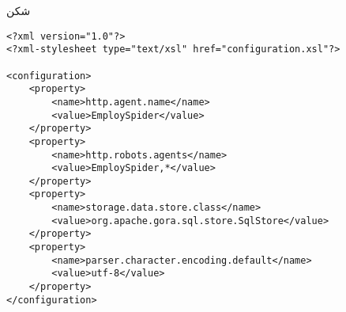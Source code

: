 ‌شکن

\begin{latin} 
\begin{lstlisting}[style=listXML]
<?xml version="1.0"?>
<?xml-stylesheet type="text/xsl" href="configuration.xsl"?>

<configuration>
	<property>
		<name>http.agent.name</name>
		<value>EmploySpider</value>
	</property>
	<property>
		<name>http.robots.agents</name>
		<value>EmploySpider,*</value>
	</property>
	<property>
		<name>storage.data.store.class</name>
		<value>org.apache.gora.sql.store.SqlStore</value>
	</property>
	<property>
		<name>parser.character.encoding.default</name>
		<value>utf-8</value>
	</property>
</configuration>
\end{lstlisting}
\end{latin}


